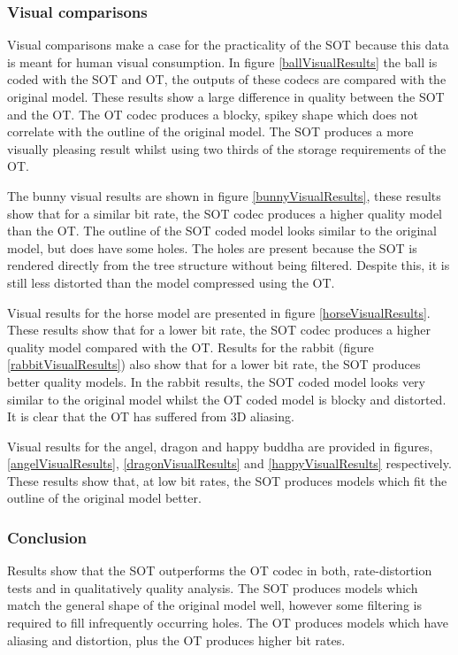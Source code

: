 \subsubsection{Visual comparisons}

Visual comparisons make a case for the practicality of the SOT because this data is meant for human visual consumption. In figure \ref{ballVisualResults} the ball is coded with the SOT and OT, the outputs of these codecs are compared with the original model. These results show a large difference in quality between the SOT and the OT. The OT codec produces a blocky, spikey shape which does not correlate with the outline of the original model. The SOT produces a more visually pleasing result whilst using two thirds of the storage requirements of the OT. 


The bunny visual results are shown in figure \ref{bunnyVisualResults}, these results show that for a similar bit rate, the SOT codec produces a higher quality model than the OT. The outline of the SOT coded model looks similar to the original model, but does have some holes. The holes are present because the SOT is rendered directly from the tree structure without being filtered. Despite this, it is still less distorted than the model compressed using the OT. 


Visual results for the horse model are presented in figure \ref{horseVisualResults}. These results show that for a lower bit rate, the SOT codec produces a higher quality model compared with the OT. Results for the rabbit (figure \ref{rabbitVisualResults}) also show that for a lower bit rate, the SOT produces better quality models. In the rabbit results, the SOT coded model looks very similar to the original model whilst the OT coded model is blocky and distorted. It is clear that the OT has suffered from 3D aliasing. 

Visual results for the angel, dragon and happy buddha are provided in figures, \ref{angelVisualResults}, \ref{dragonVisualResults} and \ref{happyVisualResults} respectively. These results show that, at low bit rates, the SOT produces models which fit the outline of the original model better.


\subsubsection{Conclusion}

Results show that the SOT outperforms the OT codec in both, rate-distortion tests and in qualitatively quality analysis. The SOT produces models which match the general shape of the original model well, however some filtering is required to fill infrequently occurring holes. The OT produces models which have aliasing and distortion, plus the OT produces higher bit rates.

